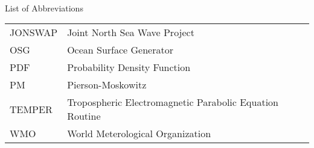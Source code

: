 

\renewcommand{\baselinestretch}{1}
\small\normalsize
\hbox{\ }
\begin{center}
\large{List of Abbreviations}
\end{center} 

\vspace{3pt}

\begin{supertabular}{ll}
JONSWAP & Joint North Sea Wave Project\\
OSG & Ocean Surface Generator \\
PDF & Probability Density Function \\
PM & Pierson-Moskowitz \\
TEMPER & Tropospheric Electromagnetic Parabolic Equation Routine \\
WMO & World Meterological Organization \\
\end{supertabular}
